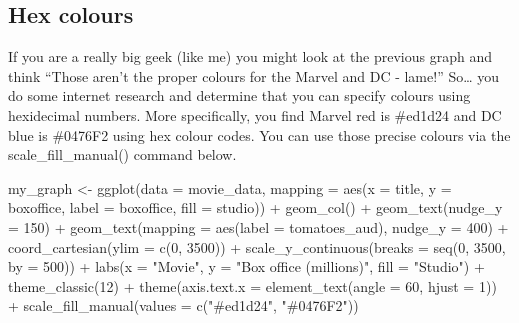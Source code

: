 \documentclass[
]{krantz}
\makeatletter
\newenvironment{Shaded}{\begin{snugshade}}{\end{snugshade}}
\newcommand{\AttributeTok}[1]{\textcolor[rgb]{0.61,0.61,0.61}{#1}}
\newcommand{\DecValTok}[1]{\textcolor[rgb]{0.06,0.06,0.06}{#1}}
\newcommand{\FunctionTok}[1]{\textcolor[rgb]{0,0,0}{#1}}
\newcommand{\NormalTok}[1]{#1}
\newcommand{\OtherTok}[1]{\textcolor[rgb]{0.37,0.37,0.37}{#1}}
\newcommand{\SpecialCharTok}[1]{\textcolor[rgb]{0,0,0}{#1}}
\newcommand{\StringTok}[1]{\textcolor[rgb]{0.5,0.5,0.5}{#1}}
\newenvironment{kframe}{%
\medskip{}
\setlength{\fboxsep}{.8em}
 \def\at@end@of@kframe{}%
 \ifinner\ifhmode%
  \def\at@end@of@kframe{\end{minipage}}%
  \begin{minipage}{\columnwidth}%
 \fi\fi%
 \def\FrameCommand##1{\hskip\@totalleftmargin \hskip-\fboxsep
 \colorbox{shadecolor}{##1}\hskip-\fboxsep
     \hskip-\linewidth \hskip-\@totalleftmargin \hskip\columnwidth}%
 \MakeFramed {\advance\hsize-\width
   \@totalleftmargin\z@ \linewidth\hsize
   \@setminipage}}%
 {\par\unskip\endMakeFramed%
 \at@end@of@kframe}
\renewenvironment{Shaded}{\begin{kframe}}{\end{kframe}}
\makeatother
\begin{document}
\hypertarget{hex-colours}{%
\subsection{Hex colours}\label{hex-colours}}

If you are a really big geek (like me) you might look at the previous graph and think ``Those aren't the proper colours for the Marvel and DC - lame!'' So\ldots{} you do some internet research and determine that you can specify colours using hexidecimal numbers. More specifically, you find Marvel red is \#ed1d24 and DC blue is \#0476F2 using hex colour codes. You can use those precise colours via the scale\_fill\_manual() command below.

\begin{Shaded}
\begin{Highlighting}[]
\NormalTok{my\_graph }\OtherTok{\textless{}{-}} \FunctionTok{ggplot}\NormalTok{(}\AttributeTok{data =}\NormalTok{ movie\_data,}
           \AttributeTok{mapping =} \FunctionTok{aes}\NormalTok{(}\AttributeTok{x =}\NormalTok{ title,}
                         \AttributeTok{y =}\NormalTok{ boxoffice,}
                         \AttributeTok{label =}\NormalTok{ boxoffice, }
                         \AttributeTok{fill =}\NormalTok{ studio)) }\SpecialCharTok{+}
  \FunctionTok{geom\_col}\NormalTok{() }\SpecialCharTok{+}
  \FunctionTok{geom\_text}\NormalTok{(}\AttributeTok{nudge\_y =} \DecValTok{150}\NormalTok{)  }\SpecialCharTok{+}
  \FunctionTok{geom\_text}\NormalTok{(}\AttributeTok{mapping =} \FunctionTok{aes}\NormalTok{(}\AttributeTok{label =}\NormalTok{ tomatoes\_aud), }
            \AttributeTok{nudge\_y =} \DecValTok{400}\NormalTok{) }\SpecialCharTok{+}
  \FunctionTok{coord\_cartesian}\NormalTok{(}\AttributeTok{ylim =} \FunctionTok{c}\NormalTok{(}\DecValTok{0}\NormalTok{, }\DecValTok{3500}\NormalTok{)) }\SpecialCharTok{+}
  \FunctionTok{scale\_y\_continuous}\NormalTok{(}\AttributeTok{breaks =} \FunctionTok{seq}\NormalTok{(}\DecValTok{0}\NormalTok{, }\DecValTok{3500}\NormalTok{, }\AttributeTok{by =} \DecValTok{500}\NormalTok{)) }\SpecialCharTok{+}
  \FunctionTok{labs}\NormalTok{(}\AttributeTok{x =} \StringTok{"Movie"}\NormalTok{,}
       \AttributeTok{y =} \StringTok{"Box office (millions)"}\NormalTok{,}
       \AttributeTok{fill =} \StringTok{"Studio"}\NormalTok{) }\SpecialCharTok{+}
  \FunctionTok{theme\_classic}\NormalTok{(}\DecValTok{12}\NormalTok{) }\SpecialCharTok{+}
  \FunctionTok{theme}\NormalTok{(}\AttributeTok{axis.text.x =} \FunctionTok{element\_text}\NormalTok{(}\AttributeTok{angle =} \DecValTok{60}\NormalTok{, }
                                   \AttributeTok{hjust =} \DecValTok{1}\NormalTok{)) }\SpecialCharTok{+}
  \FunctionTok{scale\_fill\_manual}\NormalTok{(}\AttributeTok{values =} \FunctionTok{c}\NormalTok{(}\StringTok{"\#ed1d24"}\NormalTok{, }\StringTok{"\#0476F2"}\NormalTok{))}
\end{Highlighting}
\end{Shaded}
\end{document}

